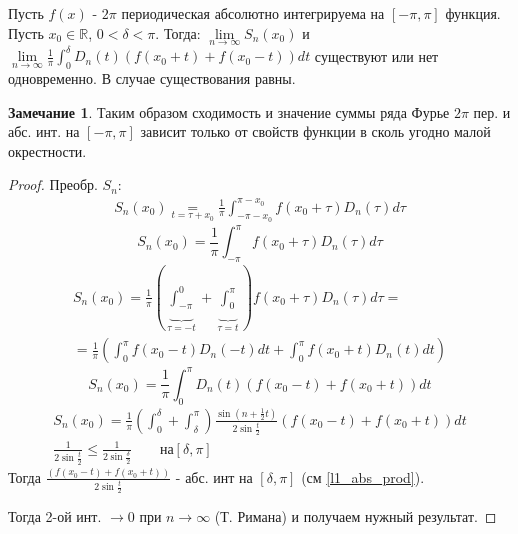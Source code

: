 \documentclass{article}
\theoremstyle{definition}
\numberwithin{theorem}{section}
\numberwithin{lemma}{section}
\numberwithin{definition}{section}
\numberwithin{corollary}{section}
\newtheorem*{remark}{Замечание}
\numberwithin{equation}{section}
\newcommand\R{\ensuremath{\mathbb{R}}}
\begin{document}
\begin{theorem}
  Пусть $f(x)$ - $2\pi$ периодическая абсолютно интегрируема на $[-\pi,\pi]$ функция.
  Пусть $x_0\in\R$, $0<\delta<\pi$. Тогда: $\lim\limits_{n\to\infty}S_n(x_0)$ и
  $\lim\limits_{n\to\infty}\frac{1}{\pi}\int_{0}^{\delta}D_n(t)(f(x_0+t)+f(x_0-t))dt$
  существуют или нет одновременно. В случае существования равны.
\end{theorem}
\begin{remark}
  Таким образом сходимость и значение суммы ряда Фурье $2\pi$ пер. и абс. инт.
  на $[-\pi,\pi]$ зависит только от свойств функции в сколь угодно малой окрестности.
\end{remark}
\begin{proof}
  Преобр. $S_n$:
  \begin{gather*}
    S_n(x_0)\underset{t=\tau+x_0}{=}\frac{1}{\pi}\int_{-\pi-x_0}^{\pi-x_0}f(x_0+\tau)D_n(\tau)d\tau 
  \end{gather*}
  \begin{equation}\label{l2_3a}
    S_n(x_0)=\frac{1}{\pi}\int_{-\pi}^{\pi}f(x_0+\tau)D_n(\tau)d\tau 
  \end{equation}
  \begin{gather*}
    S_n(x_0)=\frac{1}{\pi}(\underbrace{\int_{-\pi}^{0}}_{\tau=-t}+\underbrace{\int_{0}^{\pi}}_{\tau=t})f(x_0+\tau)D_n(\tau)d\tau = \\ 
    =\frac{1}{\pi}(\int_{0}^{\pi}f(x_0-t)D_n(-t)dt + \int_{0}^{\pi}f(x_0+t)D_n(t)dt)
  \end{gather*}
  \begin{equation}\label{l2_3b}
    S_n(x_0)=\frac{1}{\pi}\int_{0}^{\pi}D_n(t)(f(x_0-t)+f(x_0+t))dt
  \end{equation}
  \begin{gather*}
    S_n(x_0)=\frac{1}{\pi}(\int_{0}^{\delta}+\int_{\delta}^{\pi})\frac{\sin(n+\frac{1}{2}t)}{2\sin \frac{t}{2}}(f(x_0-t)+f(x_0+t))dt \\
    \frac{1}{2\sin\frac{t}{2}} \le \frac{1}{2\sin \frac{\delta}{2}} \qquad \text{на} [\delta,\pi]
  \end{gather*}
  Тогда $\frac{(f(x_0-t)+f(x_0+t))}{2\sin \frac{t}{2}}$ - абс. инт на $[\delta,\pi]$ (см \ref{l1_abs_prod}).

  Тогда 2-ой инт. $\to0$ при $n\to\infty$ (Т. Римана) и получаем нужный результат.
\end{proof}

\end{document}
